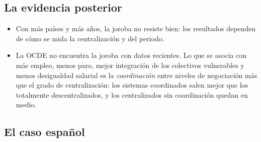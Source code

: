 \documentclass[11pt]{article}
\begin{document}
\subsection{La evidencia posterior}\label{anexo:centralizacion-evidencia}

\begin{itemize}
\item Con más países y más años, la joroba no resiste bien: los resultados dependen de cómo se mida la centralización y del periodo\nocite{Flanagan1999Macroeconomic}.
\item La OCDE no encuentra la joroba con datos recientes. Lo que se asocia con más empleo, menos paro, mejor integración de los colectivos vulnerables y menos desigualdad salarial es la \emph{coordinación} entre niveles de negociación más que el grado de centralización: los sistemas coordinados salen mejor que los totalmente descentralizados, y los centralizados sin coordinación quedan en medio\nocite{OCDE2017EmploymentOutlook,OCDE2018EmploymentOutlook,OCDE2019Negotiating}.
\end{itemize}

\subsection{El caso español}\label{anexo:centralizacion-espana}
\end{document}
